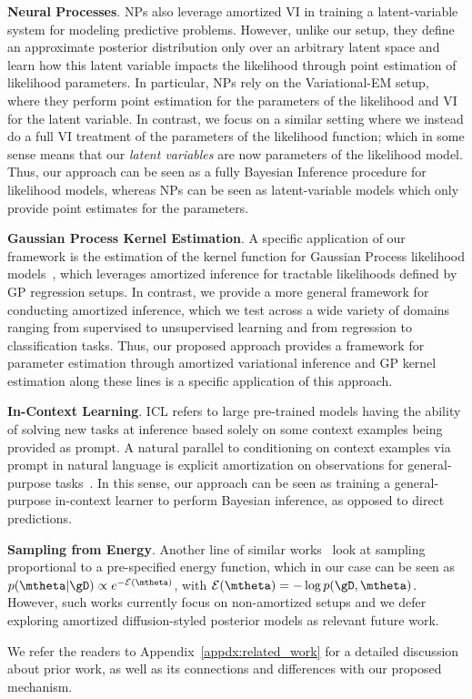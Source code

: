 \textbf{Neural Processes}. NPs also leverage amortized VI in training a latent-variable system for modeling predictive problems. However, unlike our setup, they define an approximate posterior distribution only over an arbitrary latent space and learn how this latent variable impacts the likelihood through point estimation of likelihood parameters. In particular, NPs rely on the Variational-EM setup, where they perform point estimation for the parameters of the likelihood and VI for the latent variable. In contrast, we focus on a similar setting where we instead do a full VI treatment of the parameters of the likelihood function; which in some sense means that our \emph{latent variables} are now parameters of the likelihood model. Thus, our approach can be seen as a fully Bayesian Inference procedure for likelihood models, whereas NPs can be seen as latent-variable models which only provide point estimates for the parameters. 

\textbf{Gaussian Process Kernel Estimation}. A specific application of our framework is the estimation of the kernel function for Gaussian Process likelihood models~\citep{liu2020task,simpson2021kernel,bitzer2023amortized}, which leverages amortized inference for tractable likelihoods defined by GP regression setups. In contrast, we provide a more general framework for conducting amortized inference, which we test across a wide variety of domains ranging from supervised to unsupervised learning and from regression to classification tasks. Thus, our proposed approach provides a framework for parameter estimation through amortized variational inference and GP kernel estimation along these lines is a specific application of this approach.

\textbf{In-Context Learning}. ICL refers to large pre-trained models having the ability of solving new tasks at inference based solely on some context examples being provided as prompt. A natural parallel to conditioning on context examples via prompt in natural language is explicit amortization on observations for general-purpose tasks~\citep{von2023transformers,muller2021transformers}. In this sense, our approach can be seen as training a general-purpose in-context learner to perform Bayesian inference, as opposed to direct predictions. 

\textbf{Sampling from Energy}. Another line of similar works~\citep{zhang2021path,berner2022optimal,vargas2023denoising,akhound2024iterated,bengio2021flow} look at sampling proportional to a pre-specified energy function, which in our case can be seen as $p(\mtheta | \gD) \propto e^{-\mathcal{E}(\mtheta)}$, with $\mathcal{E}(\mtheta) = -\log p(\gD, \mtheta)$. However, such works currently focus on non-amortized setups and we defer exploring amortized diffusion-styled posterior models as relevant future work.

We refer the readers to Appendix~\ref{appdx:related_work} for a detailed discussion about prior work, as well as its connections and differences with our proposed mechanism.